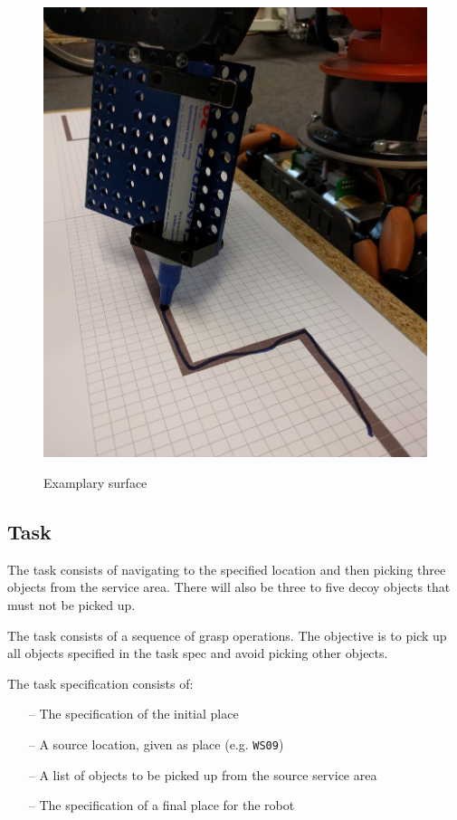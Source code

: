 \begin{figure}[h!]
\begin{center}
{\includegraphics[height = \textwidth/3]{./images/LFT_setup}}
\end{center}
\caption{Examplary surface}
\label{ast_examplesurface}
\end{figure}


\subsection{Task}
The task consists of navigating to the specified location and then
picking three objects from the service area. There will also be three to five decoy objects that must not be picked up.
\par
The task consists of a sequence of grasp operations. The objective is to pick up all objects specified in the task spec and avoid picking other objects.
\par
The task specification consists of:
\begin{itemize}
	\item[--] The specification of the initial place
	\item[--] A source location, given as place (e.g. \texttt{WS09})
	\item[--] A list of objects to be picked up from the source service area
	\item[--] The specification of a final place for the robot
\end{itemize}


